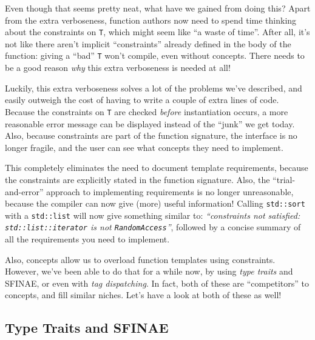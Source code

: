     \noindent Even though that seems pretty neat, what have we gained from doing this? Apart from the extra verboseness, function authors now need to spend  time thinking about the constraints on \texttt{T}, which might seem like ``a waste of time''. After all, it's not like there aren't implicit ``constraints'' already defined in the body of the function: giving a ``bad'' \texttt{T} won't compile, even without concepts. There needs to be a good reason \emph{why} this extra verboseness is needed at all!

    Luckily, this extra verboseness solves a lot of the problems we've described, and easily outweigh the cost of having to write a couple of extra lines of code. Because the constraints on \texttt{T} are checked \emph{before} instantiation occurs, a more reasonable error message can be displayed instead of the ``junk'' we get today. Also, because constraints are part of the function signature, the interface is no longer fragile, and the user can see what concepts they need to implement.

    This completely eliminates the need to document template requirements, because the constraints are explicitly stated in the function signature. Also, the ``trial-and-error'' approach to implementing requirements is no longer unreasonable, because the compiler can now give (more) useful information! Calling \texttt{std::sort} with a \texttt{std::list} will now give something similar to: \emph{``constraints not satisfied: \texttt{std::list::iterator} is not \texttt{RandomAccess}''}, followed by a concise summary of all the requirements you need to implement.

    Also, concepts allow us to overload function templates using constraints. However, we've been able to do that for a while now, by using \emph{type traits} and SFINAE, or even with \emph{tag dispatching}. In fact, both of these are ``competitors'' to concepts, and fill similar niches. Let's have a look at both of these as well!

\subsection{Type Traits and SFINAE} \label{sec:type_traits_and_sfinae}


